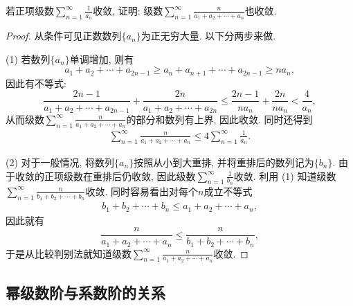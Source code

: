 \documentclass[../../main.tex]{subfiles}%
\begin{document}
\begin{example}
若正项级数$\sum\limits_{n=1}^{\infty}\frac{1}{a_n}$收敛, 证明: 级数$\sum\limits_{n=1}^{\infty}\frac{n}{a_1+a_2+\cdots+a_n}$也收敛.
\end{example}
\begin{proof}

从条件可见正数数列$\{a_n\}$为正无穷大量. 以下分两步来做.

(1) 若数列$\{a_n\}$单调增加, 则有
$$a_1+a_2+\cdots+a_{2n-1}\geqslant a_n+a_{n+1}+\cdots+a_{2n-1}\geqslant na_n,$$
因此有不等式:
$$\frac{2n-1}{a_1+a_2+\cdots+a_{2n-1}}+\frac{2n}{a_1+a_2+\cdots+a_{2n}}\leqslant \frac{2n-1}{na_n}+\frac{2n}{na_n}<\frac{4}{a_n},$$
从而级数$\sum\limits_{n=1}^{\infty}\frac{n}{a_1+a_2+\cdots+a_n}$的部分和数列有上界, 因此收敛. 同时还得到
\begin{align*}
\sum_{n=1}^{\infty}\frac{n}{a_1+a_2+\cdots+a_n}\leqslant 4\sum_{n=1}^{\infty}\frac{1}{a_n}.
\end{align*}

(2) 对于一般情况, 将数列$\{a_n\}$按照从小到大重排, 并将重排后的数列记为$\{b_n\}$. 由于收敛的正项级数在重排后仍收敛, 因此级数$\sum\limits_{n=1}^{\infty}\frac{1}{b_n}$收敛. 利用 (1) 知道级数$\sum\limits_{n=1}^{\infty}\frac{n}{b_1+b_2+\cdots+b_n}$收敛. 同时容易看出对每个$n$成立不等式
\begin{align*}
b_1+b_2+\cdots+b_n\leqslant a_1+a_2+\cdots+a_n,
\end{align*}
因此就有
$$\frac{n}{a_1+a_2+\cdots+a_n}\leqslant \frac{n}{b_1+b_2+\cdots+b_n},$$
于是从比较判别法就知道级数$\sum\limits_{n=1}^{\infty}\frac{n}{a_1+a_2+\cdots+a_n}$收敛.

\end{proof}





\subsection{幂级数阶与系数阶的关系}
\end{document}
